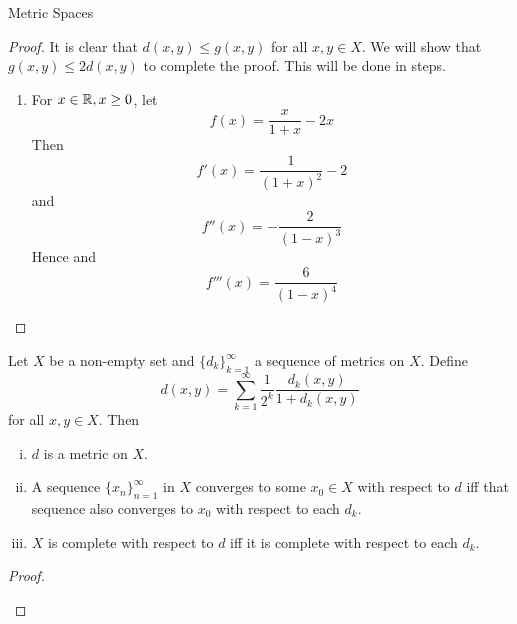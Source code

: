 \begin{section}{Metric Spaces}
\begin{proof}
	It is clear that $d(x,y) \leq g(x,y)$ for all $x,y \in X$.
	We will show that $g(x,y) \leq 2d(x,y)$ to complete the
	proof. This will be done in steps.
		\begin{enumerate}[{Step} 1]
			
			\item
				For ${x} \in \mathbb{R}, x \geq 0$, let
					\begin{displaymath}
						f(x)=\frac{x}{1+x}-2x
					\end{displaymath}
				Then
					\begin{displaymath}
						f'(x)=\frac{1}{(1+x)^2}-2
					\end{displaymath}
				and
					\begin{displaymath}
						f''(x)=-\frac{2}{(1-x)^3}
					\end{displaymath}
				Hence 
					and
					\begin{displaymath}
						f'''(x)=\frac{6}{(1-x)^4}
					\end{displaymath}
		\end{enumerate}
\end{proof}


\begin{thrm}\label{thrm:SumOfMetrics}
	Let $X$ be a non-empty set and $\{d_k\}_{k=1}^\infty$ a
	sequence of metrics on $X$. Define
		\begin{displaymath}
			d(x,y)=\sum_{k=1}^\infty \frac{1}{2^k} \frac
				{d_k(x,y)}{1+d_k(x,y)}
		\end{displaymath}
	for all $x,y \in X$. Then
		\begin{enumerate}[i)]
			\item
				$d$ is a metric on $X$.
			\item
				A sequence $\{x_n\}_{n=1}^\infty$ in $X$ converges
				to some $x_0 \in X$ with respect to $d$ iff that 
				sequence also converges to $x_0$ with respect to each $d_k$.
			\item
				$X$ is complete with respect to $d$ iff it is complete
				with respect to each $d_k$.
		\end{enumerate}
\end{thrm}

\begin{proof}
	\begin{enumerate}[i)]
		

\end{enumerate}
\end{proof}
\end{section}
